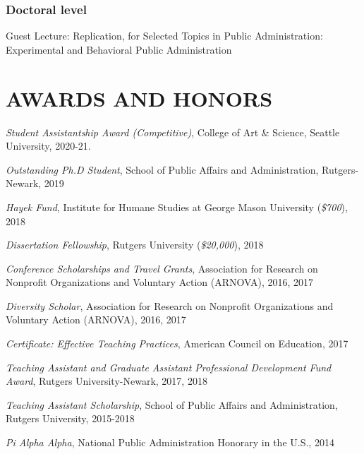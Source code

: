 \documentclass[letterpaper]{article}
\renewenvironment{itemize}{
  \begin{list}{}{
    \setlength{\leftmargin}{1.5em}
  }
}{
  \end{list}
}
\begin{document}
\subsubsection*{Doctoral level}
\begin{itemize}	
\item Guest Lecture: Replication, for Selected Topics in Public Administration: Experimental and Behavioral Public Administration
\end{itemize}

\bigskip


\section*{AWARDS AND HONORS}
\begin{itemize}
	
\item {\it Student Assistantship Award (Competitive)}, College of Art \& Science, Seattle University, 2020-21. 
	
\item {\it Outstanding Ph.D Student}, School of Public Affairs and Administration, Rutgers-Newark, 2019

\item {\it Hayek Fund}, Institute for Humane Studies at George Mason University ({\it \$700}), 2018

\item {\it Dissertation Fellowship}, Rutgers University ({\it \$20,000}), 2018

\item {\it Conference Scholarships and Travel Grants}, Association for Research on Nonprofit Organizations and Voluntary Action (ARNOVA), 2016, 2017

\item {\it Diversity Scholar}, Association for Research on Nonprofit Organizations and Voluntary Action (ARNOVA), 2016, 2017

\item {\it Certificate: Effective Teaching Practices}, American Council on Education, 2017

\item {\it Teaching Assistant and Graduate Assistant Professional Development Fund Award}, Rutgers University-Newark, 2017, 2018

\item {\it Teaching Assistant Scholarship}, School of Public Affairs and Administration, Rutgers University, 2015-2018

\item {\it Pi Alpha Alpha}, National Public Administration Honorary in the U.S., 2014

\end{itemize}
\end{document}
